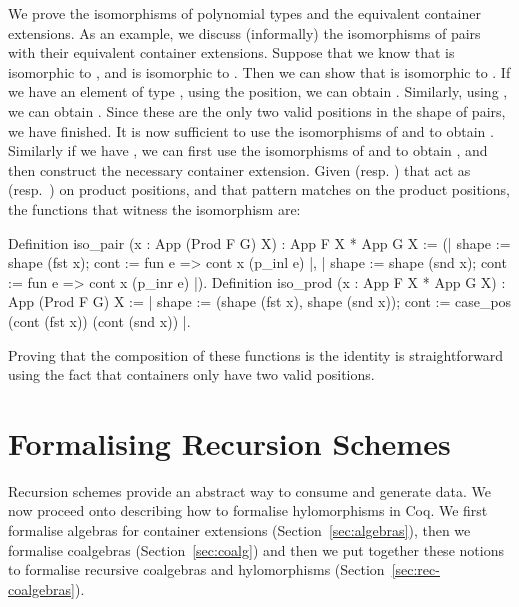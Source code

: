 \documentclass[ a4paper, UKenglish, cleveref, autoref, thm-restate]{lipics-v2021}
\begin{document}
We prove the isomorphisms of polynomial types and the equivalent 
container extensions. As an example, we discuss (informally) the isomorphisms
of pairs with their equivalent container extensions. Suppose that we
know that  is isomorphic to , and
 is isomorphic to . Then we can
show that  is isomorphic to
.  If we have an element of type 
,
using the  position, we can obtain
.  Similarly, using , we can
obtain . Since these are the only two valid positions
in the shape of pairs, we have finished. It is now sufficient to use the
isomorphisms of  and  to
obtain . Similarly if we have ,
we can first use the isomorphisms of 
 and
 to obtain
, and then construct the necessary container
extension. Given  (resp. ) that
act as  (resp.\ ) on product positions, and
 that pattern
matches on the product positions, the functions that witness the isomorphism
are:
\begin{coqcode}
Definition iso_pair (x : App (Prod F G) X) : App F X * App G X :=
  ({| shape := shape (fst x); cont := fun e => cont x (p_inl e) |}, 
   {| shape := shape (snd x); cont := fun e => cont x (p_inr e) |}).
Definition iso_prod (x : App F X * App G X) : App (Prod F G) X :=
{| shape := (shape (fst x), shape (snd x));
   cont := case_pos (cont (fst x)) (cont (snd x)) |}.
\end{coqcode}
Proving that the composition of these functions is the identity is
straightforward using the fact that  containers only have two valid
positions.

\section{Formalising Recursion Schemes}
Recursion schemes provide an abstract way to consume and generate data. We now
proceed onto describing how to formalise hylomorphisms in Coq. We first
formalise algebras for container extensions (Section~\ref{sec:algebras}), then
we formalise coalgebras (Section~\ref{sec:coalg}) and then we put together
these notions to formalise recursive coalgebras and hylomorphisms
(Section~\ref{sec:rec-coalgebras}).
\end{document}

